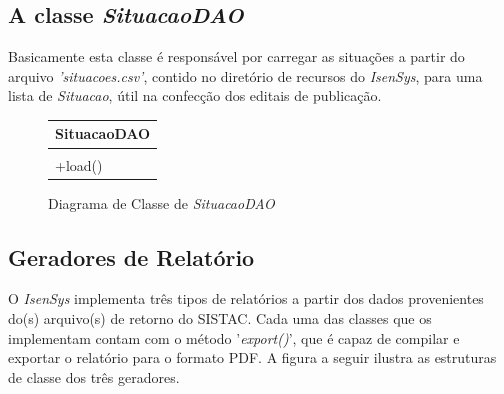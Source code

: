 \documentclass[
	12pt,			%
	openright,		%
	oneside,	
	a4paper,		%
	english,		%
	brazil			%
]{abntex2/abntex2}  %
\begin{document}
			\subsection{A classe \textit{SituacaoDAO}}
	
				Basicamente esta classe é responsável por carregar as situações a partir do arquivo \textit{'situacoes.csv'}, contido no diretório de recursos do \textit{IsenSys}, para uma lista de \textit{Situacao}, útil na confecção dos editais de publicação.
	
				\begin{figure}[ht]
					\begin{center}
						
						\caption{Diagrama de Classe de \textit{SituacaoDAO}}
						\label{situacaodao-uml}
						
						\begin{tabular}{|l|}
							\hline
							\multicolumn{1}{|c|}{\textbf{SituacaoDAO}} \\ \hline
							                                           \\ \hline
							+load()                                    \\ \hline
						\end{tabular}
						
					\end{center}
				\end{figure}
	
			\subsection{Geradores de Relatório}
	
				O \textit{IsenSys} implementa três tipos de relatórios a partir dos dados provenientes do(s) arquivo(s) de retorno do SISTAC. Cada uma das classes que os implementam contam com o método '\textit{export()}', que é capaz de compilar e exportar o relatório para o formato PDF. A figura a seguir ilustra as estruturas de classe dos três geradores.
	
\end{document}
